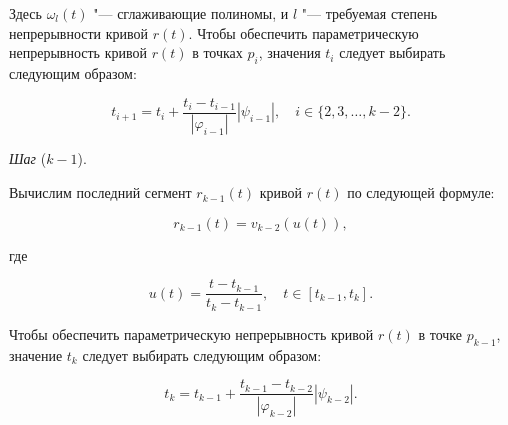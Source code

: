 Здесь $\omega_l(t)$ "--- сглаживающие полиномы, и $l$ "--- требуемая степень непрерывности кривой $r(t)$. Чтобы обеспечить
параметрическую непрерывность кривой $r(t)$ в точках $p_i$, значения $t_i$ следует выбирать следующим образом:

$$
t_{i+1}=t_i+\frac{t_i-t_{i-1}}{|\varphi_{i-1}|}|\psi_{i-1}|, \quad i \in \{2,3,\dots,k-2\}.
$$

\bigskip
\textit{Шаг} ($k-1$).

Вычислим последний сегмент $r_{k-1}(t)$ кривой $r(t)$ по следующей формуле:

$$
r_{k-1}(t)=v_{k-2}(u(t)),
$$

\noindent где

$$
u(t)=\frac{t-t_{k-1}}{t_k-t_{k-1}}, \quad t \in [t_{k-1},t_k].
$$

Чтобы обеспечить параметрическую непрерывность кривой $r(t)$ в точке $p_{k-1}$, значение $t_k$ следует выбирать
следующим образом:

$$
t_k=t_{k-1}+\frac{t_{k-1}-t_{k-2}}{|\varphi_{k-2}|}|\psi_{k-2}|.
$$
